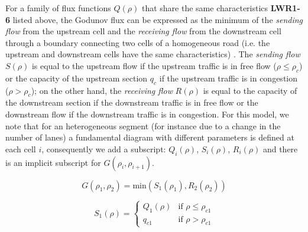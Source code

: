 For a family of flux functions $Q(\rho)$ that share the same characteristics \textbf{LWR1-6} listed above, the Godunov flux can be expressed as the minimum of the \textit{sending flow} from the upstream cell and the \textit{receiving flow} from the downstream cell through a boundary connecting two cells of a homogeneous road (i.e. the upstream and downstream cells have the same characteristics) \footnotemark. The \textit{sending flow} $S(\rho)$ is equal to the upstream flow if the upstream traffic is in free flow ($\rho \leq \rho_{c}$) or the capacity of the upstream section $q_{c}$ if the upstream traffic is in congestion ($\rho > \rho_{c}$); on the other hand, the \textit{receiving flow} $R(\rho)$ is equal to the capacity of the downstream section if the downstream traffic is in free flow or the downstream flow if the downstream traffic is in congestion. For this model, we note that for an heterogeneous segment (for instance due to a change in the number of lanes) a fundamental diagram with different parameters is defined at each cell $i$, consequently we add a subscript: $Q_{i}(\rho)$, $S_{i}(\rho)$, $R_{i}(\rho)$ and there is an implicit subscript for $G(\rho_{i},\rho_{i+1})$.


\begin{equation} \label{eq:rhoGodunovFlux1}
G(\rho_{1},\rho_{2}) = \text{min}(S_{1}(\rho_{1}),R_{2}(\rho_{2}))
\end{equation}

\begin{equation} \label{eq:sendingFlow1}
S_{1}(\rho) = \begin{cases}
Q_{1}(\rho) & \text{if } \rho \leq \rho_{c1} \\
q_{c1} &  \text{if } \rho > \rho_{c1}
\end{cases}
\end{equation}

